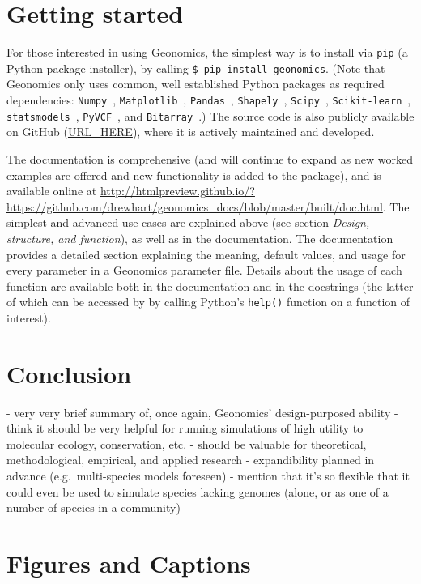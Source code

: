 ﻿\documentclass{article}
\begin{document}
\section{Getting started}
For those interested in using Geonomics, the simplest way is to install
via \texttt{pip} (a Python package installer),
by calling \texttt{\$ pip install geonomics}.
(Note that Geonomics only uses common, well established Python packages
as required dependencies:
\texttt{Numpy}~\cite{numpy},
\texttt{Matplotlib}~\cite{matplotlib},
\texttt{Pandas}~\cite{pandas},
\texttt{Shapely}~\cite{shapely},
\texttt{Scipy}~\cite{scipy},
\texttt{Scikit-learn}~\cite{scikit-learn},
\texttt{statsmodels}~\cite{statsmodels},
\texttt{PyVCF}~\cite{pyvcf},
and \texttt{Bitarray}~\cite{bitarray}.)
The source code is also publicly available on GitHub (\url{URL\_HERE}),
where it is actively maintained and developed.

The documentation is comprehensive (and will continue to expand as new worked examples
are offered and new functionality is added to the package), and is available
online at \url{http://htmlpreview.github.io/?https://github.com/drewhart/geonomics\_docs/blob/master/built/doc.html}.  
The simplest and advanced use cases are explained above (see section
\emph{Design, structure, and function}), as well as in the documentation.
The documentation provides a detailed section explaining the meaning,
default values, and usage for every parameter in a Geonomics parameter file.
Details about the usage of each function are available both in the documentation
and in the docstrings (the latter of which can be accessed by by calling Python's
\texttt{help()} function on a function of interest).


\section{Conclusion}
- very very brief summary of, once again, Geonomics' design-purposed ability
- think it should be very helpful for running simulations of high utility to
  molecular ecology, conservation, etc. 
- should be valuable for theoretical, methodological, empirical, and applied research
- expandibility planned in advance (e.g.\ multi-species models foreseen)
- mention that it's so flexible that it could even be used to simulate species lacking genomes (alone, or as one of a number of species in a community)





\pagebreak
\section{Figures and Captions}
\end{document}

